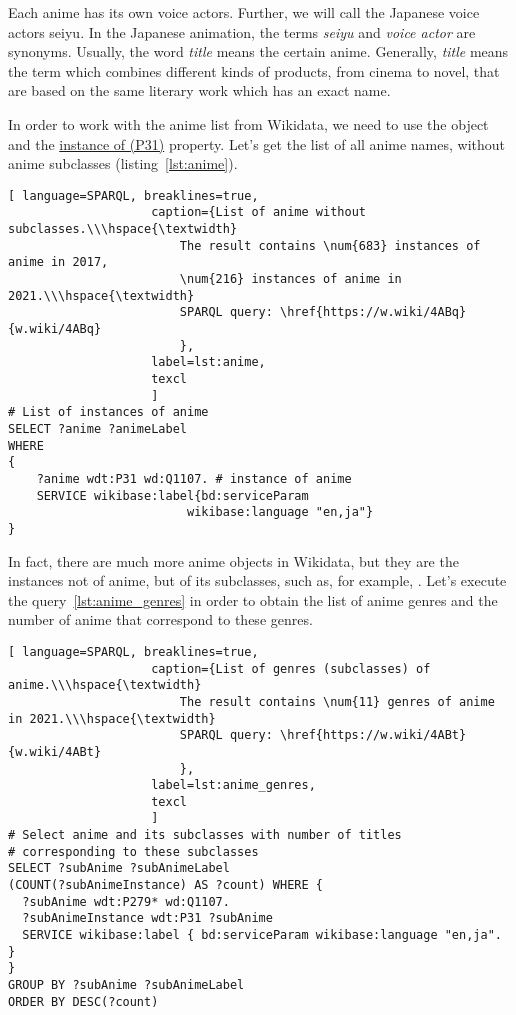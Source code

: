 Each anime has its own voice actors. Further, we will call the Japanese voice actors seiyu. In the Japanese animation, the terms \emph{seiyu} and \emph{voice actor} are synonyms. Usually, the word \emph{title} means the certain anime. Generally, \emph{title} means the term which combines different kinds of products, from cinema to novel, that are based on the same literary work which has an exact name.

In order to work with the anime list from Wikidata, we need to use the  object and the \href{https://www.wikidata.org/wiki/Property:P31}{instance of (P31)} property. Let's get the list of all anime names, without anime subclasses (listing~\protect\ref{lst:anime}).

\begin{lstlisting}[ language=SPARQL, breaklines=true, 
                    caption={List of anime without subclasses.\\\hspace{\textwidth}
                        The result contains \num{683} instances of anime in 2017, 
                        \num{216} instances of anime in 2021.\\\hspace{\textwidth}
                        SPARQL query: \href{https://w.wiki/4ABq}{w.wiki/4ABq}
                        },
                    label=lst:anime,
                    texcl 
                    ]
# List of instances of anime
SELECT ?anime ?animeLabel
WHERE
{
    ?anime wdt:P31 wd:Q1107. # instance of anime
    SERVICE wikibase:label{bd:serviceParam
					     wikibase:language "en,ja"}
}
\end{lstlisting}%

In fact, there are much more anime objects in Wikidata, but they are the instances not of anime, but of its subclasses, such as, for example, . Let's execute the query~\protect\ref{lst:anime_genres} in order to obtain the list of anime genres and the number of anime that correspond to these genres.

\begin{lstlisting}[ language=SPARQL, breaklines=true, 
                    caption={List of genres (subclasses) of anime.\\\hspace{\textwidth}
                        The result contains \num{11} genres of anime in 2021.\\\hspace{\textwidth}
                        SPARQL query: \href{https://w.wiki/4ABt}{w.wiki/4ABt}
                        },
                    label=lst:anime_genres,
                    texcl 
                    ]
# Select anime and its subclasses with number of titles
# corresponding to these subclasses
SELECT ?subAnime ?subAnimeLabel
(COUNT(?subAnimeInstance) AS ?count) WHERE {
  ?subAnime wdt:P279* wd:Q1107.
  ?subAnimeInstance wdt:P31 ?subAnime
  SERVICE wikibase:label { bd:serviceParam wikibase:language "en,ja". }
}
GROUP BY ?subAnime ?subAnimeLabel
ORDER BY DESC(?count)
\end{lstlisting}%

